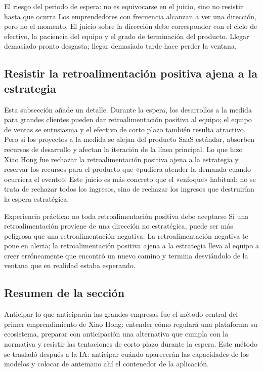 \begin{warningbox}{El riesgo del periodo de espera: no es equivocarse en el juicio, sino no resistir hasta que ocurra}
Los emprendedores con frecuencia alcanzan a ver una dirección, pero no el momento. El juicio sobre la dirección debe corresponder con el ciclo de efectivo, la paciencia del equipo y el grado de terminación del producto. Llegar demasiado pronto desgasta; llegar demasiado tarde hace perder la ventana.
\end{warningbox}

\subsection{Resistir la retroalimentación positiva ajena a la estrategia}

Esta subsección añade un detalle. Durante la espera, los desarrollos a la medida para grandes clientes pueden dar retroalimentación positiva al equipo; el equipo de ventas se entusiasma y el efectivo de corto plazo también resulta atractivo. Pero si los proyectos a la medida se alejan del producto SaaS estándar, absorben recursos de desarrollo y afectan la iteración de la línea principal. Lo que hizo Xiao Hong fue rechazar la retroalimentación positiva ajena a la estrategia y reservar los recursos para el producto que «pudiera atender la demanda cuando ocurriera el evento». Este juicio es más concreto que el «enfoque» habitual: no se trata de rechazar todos los ingresos, sino de rechazar los ingresos que destruirían la espera estratégica.

\begin{importantbox}{Experiencia práctica: no toda retroalimentación positiva debe aceptarse}
Si una retroalimentación proviene de una dirección no estratégica, puede ser más peligrosa que una retroalimentación negativa. La retroalimentación negativa te pone en alerta; la retroalimentación positiva ajena a la estrategia lleva al equipo a creer erróneamente que encontró un nuevo camino y termina desviándolo de la ventana que en realidad estaba esperando.
\end{importantbox}

\subsection{Resumen de la sección}

Anticipar lo que anticiparán las grandes empresas fue el método central del primer emprendimiento de Xiao Hong: entender cómo regulará una plataforma su ecosistema, preparar con anticipación una alternativa que cumpla con la normativa y resistir las tentaciones de corto plazo durante la espera. Este método se trasladó después a la IA: anticipar cuándo aparecerán las capacidades de los modelos y colocar de antemano ahí el contenedor de la aplicación.
